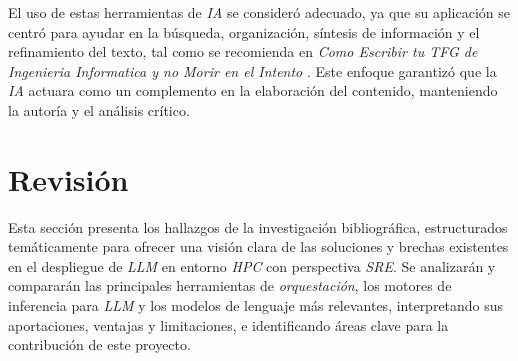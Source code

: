 El uso de estas herramientas de \textit{IA} se consideró adecuado, ya que su aplicación se centró para ayudar en la búsqueda, organización, síntesis de información y el refinamiento del texto, tal como se recomienda en \textit{Como Escribir tu TFG de Ingenieria Informatica y no Morir en el Intento} \cite{ref34}. Este enfoque garantizó que la \textit{IA} actuara como un complemento en la elaboración del contenido, manteniendo la autoría y el análisis crítico.

\section{Revisión}
Esta sección presenta los hallazgos de la investigación bibliográfica, estructurados temáticamente para ofrecer una visión clara de las soluciones y brechas existentes en el despliegue de \textit{LLM} en entorno \textit{HPC} con perspectiva \textit{SRE}. Se analizarán y compararán las principales herramientas de \textit{orquestación}, los motores de inferencia para \textit{LLM} y los modelos de lenguaje más relevantes, interpretando sus aportaciones, ventajas y limitaciones, e identificando áreas clave para la contribución de este proyecto.

